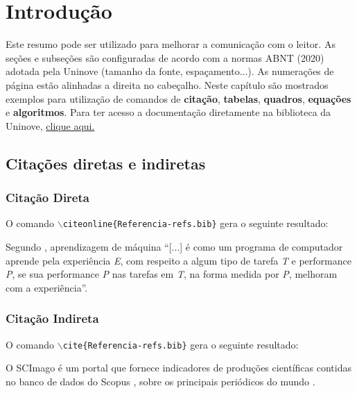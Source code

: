 \chapter{Introdução}
\label{ch:introducao}
\begin{resumocapitulo}
	Este resumo pode ser utilizado para melhorar a comunicação com o leitor. As seções e subseções são configuradas de acordo com a normas ABNT (2020) adotada pela Uninove (tamanho da fonte, espaçamento...). As numerações de página estão alinhadas a direita no cabeçalho. Neste capítulo são mostrados exemplos para utilização de comandos de \textbf{citação}, \textbf{tabelas}, \textbf{quadros}, \textbf{equações} e \textbf{algoritmos}. Para ter acesso a documentação diretamente na biblioteca da Uninove, \href{http://docs.uninove.br/arte/pdfs/Manual_de_Trabalhos_Academicos_ABNT_UNINOVE.pdf}{clique aqui.}
\end{resumocapitulo}

\section{Citações diretas e indiretas}
\label{sec:citacoes}
\subsection{Citação Direta}
\label{subsec:citacao_direta}
O comando \texttt{$\backslash$citeonline\{Referencia-refs.bib\}} gera o seguinte resultado:

Segundo , aprendizagem de máquina ``[...] é como um programa de computador aprende pela experiência \textit{E}, com respeito a algum tipo de tarefa \textit{T} e performance \textit{P}, se sua performance \textit{P} nas tarefas em \textit{T}, na forma medida por \textit{P}, melhoram com a experiência''.

\subsection{Citação Indireta}
\label{subsec:citacao_indireta}
O comando \texttt{$\backslash$cite\{Referencia-refs.bib\}} gera o seguinte resultado:

O SCImago é um portal que fornece indicadores de produções científicas contidas no banco de dados do Scopus \cite{Villasenor-Almaraz2019}, sobre os principais periódicos do mundo \cite{DUggento2016}.

